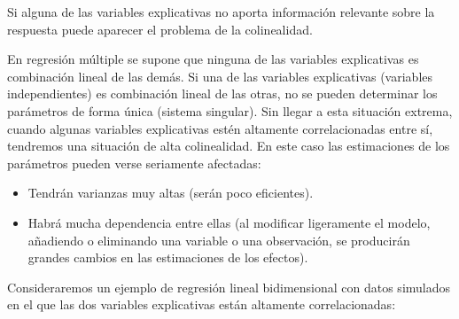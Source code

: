 \documentclass[
  spanish,
]{book}
\theoremstyle{break}
\theoremstyle{definition}
\theoremstyle{definition}
\theoremstyle{definition}
\theoremstyle{definition}
\theoremstyle{remark}
\begin{document}
Si alguna de las variables explicativas no aporta información relevante sobre la respuesta puede aparecer el problema de la colinealidad.

En regresión múltiple se supone que ninguna de las variables explicativas es combinación lineal de las demás.
Si una de las variables explicativas (variables independientes) es combinación lineal de las otras, no se pueden determinar los parámetros de forma única (sistema singular).
Sin llegar a esta situación extrema, cuando algunas variables explicativas estén altamente correlacionadas entre sí, tendremos una situación de alta colinealidad.
En este caso las estimaciones de los parámetros pueden verse seriamente afectadas:

\begin{itemize}
\item
  Tendrán varianzas muy altas (serán poco eficientes).
\item
  Habrá mucha dependencia entre ellas (al modificar ligeramente el
  modelo, añadiendo o eliminando una variable o una observación,
  se producirán grandes cambios en las estimaciones de los efectos).
\end{itemize}

Consideraremos un ejemplo de regresión lineal bidimensional con datos simulados en el que las dos variables explicativas están altamente correlacionadas:
\end{document}
